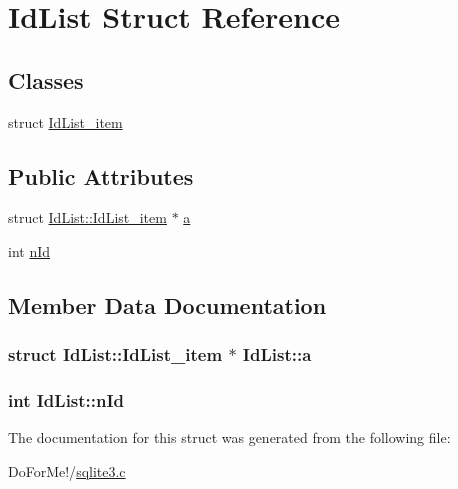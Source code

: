 \hypertarget{struct_id_list}{\section{Id\-List Struct Reference}
\label{struct_id_list}
}
\subsection*{Classes}
\begin{DoxyCompactItemize}
\item 
struct \hyperlink{struct_id_list_1_1_id_list__item}{Id\-List\-\_\-item}
\end{DoxyCompactItemize}
\subsection*{Public Attributes}
\begin{DoxyCompactItemize}
\item 
struct \hyperlink{struct_id_list_1_1_id_list__item}{Id\-List\-::\-Id\-List\-\_\-item} $\ast$ \hyperlink{struct_id_list_ad33082fd71286c1159711a1a3e979763}{a}
\item 
int \hyperlink{struct_id_list_afb785717796d8b3c72d1ae682dcb6ff0}{n\-Id}
\end{DoxyCompactItemize}


\subsection{Member Data Documentation}
\hypertarget{struct_id_list_ad33082fd71286c1159711a1a3e979763}{
\subsubsection[{a}]{\setlength{\rightskip}{0pt plus 5cm}struct {\bf Id\-List\-::\-Id\-List\-\_\-item} $\ast$ Id\-List\-::a}}\label{struct_id_list_ad33082fd71286c1159711a1a3e979763}
\hypertarget{struct_id_list_afb785717796d8b3c72d1ae682dcb6ff0}{
\subsubsection[{n\-Id}]{\setlength{\rightskip}{0pt plus 5cm}int Id\-List\-::n\-Id}}\label{struct_id_list_afb785717796d8b3c72d1ae682dcb6ff0}


The documentation for this struct was generated from the following file\-:\begin{DoxyCompactItemize}
\item 
Do\-For\-Me!/\hyperlink{sqlite3_8c}{sqlite3.\-c}\end{DoxyCompactItemize}
